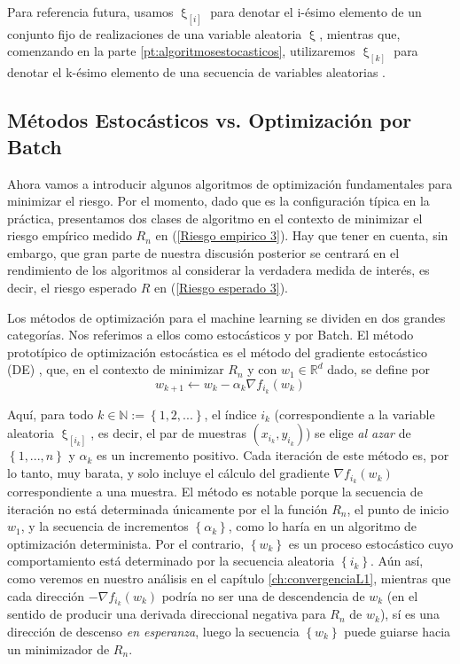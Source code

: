 Para referencia futura, usamos $\upxi_{\left [ i \right ]}$ para denotar el i-\'esimo elemento de un conjunto fijo de realizaciones de una variable aleatoria $\upxi$, mientras que, comenzando en la parte \ref{pt:algoritmosestocasticos}, utilizaremos $\upxi_{\left [ k \right ]}$ para denotar el k-\'esimo elemento de una secuencia de variables aleatorias .

\subsection{M\'etodos Estoc\'asticos vs. Optimizaci\'on por Batch}
Ahora vamos a introducir algunos algoritmos de optimizaci\'on fundamentales para minimizar el riesgo. Por el momento, dado que es la configuraci\'on t\'ipica en la pr\'actica, presentamos dos clases de algoritmo en el contexto de minimizar el riesgo emp\'irico medido $R_n$ en (\ref{Riesgo empirico 3}). Hay que tener en cuenta, sin embargo, que gran parte de nuestra discusi\'on posterior se centrar\'a en el rendimiento de los algoritmos al considerar la verdadera medida de inter\'es, es decir, el riesgo esperado $R$ en (\ref{Riesgo esperado 3}).

Los m\'etodos de optimizaci\'on para el machine learning se dividen en dos grandes categor\'ias. Nos referimos a ellos como estoc\'asticos y por Batch. El m\'etodo protot\'ipico de optimizaci\'on estoc\'astica es el m\'etodo del gradiente estoc\'astico (DE) \cite{robbins:1951}, que, en el contexto de minimizar $R_n$ y con $w_1\in \mathbb{R}^d$ dado, se define por
\begin{equation}
\label{def: DE}
w_{k+1} \gets w_k - \alpha_k \nabla f_{i_k} (w_k)
\end{equation}

Aqu\'i, para todo $k \in \mathbb{N} := \left\lbrace 1, 2, ... \right\rbrace $, el \'indice $i_k$ (correspondiente a la variable aleatoria $\upxi_{\left[ i_k \right]}$, es decir, el par de muestras $(x_{i_k}, y_{i_k})$) se elige \textit{al azar} de $\left\lbrace 1,. . . , n \right\rbrace$ y $\alpha _k$ es un incremento positivo. Cada iteraci\'on de este m\'etodo es, por lo tanto, muy barata, y solo incluye el c\'alculo del gradiente $\nabla f_{i_k} (w_k)$ correspondiente a una muestra. El m\'etodo es notable porque la secuencia de iteraci\'on no est\'a determinada \'unicamente por el
	la funci\'on $R_n$, el punto de inicio $w_1$, y la secuencia de incrementos $\left\lbrace \alpha _k \right\rbrace $, como lo har\'ia en un algoritmo de optimizaci\'on determinista. Por el contrario, $\left\lbrace w_k \right\rbrace $ es un proceso estoc\'astico cuyo comportamiento est\'a determinado por la secuencia aleatoria $\left\lbrace i_k \right\rbrace $. A\'un as\'i, como veremos en nuestro an\'alisis en el cap\'itulo \ref{ch:convergenciaL1}, mientras que cada direcci\'on $- \nabla f_{i_k} (w_k)$ podr\'ia no ser una de descendencia de $w_k$ (en el sentido de producir una derivada direccional negativa para $R_n$ de $w_k$), s\'i es una direcci\'on de descenso \textit{en esperanza}, luego la secuencia $\left\lbrace w_k \right\rbrace $ puede guiarse hacia un minimizador de $R_n$.
	
